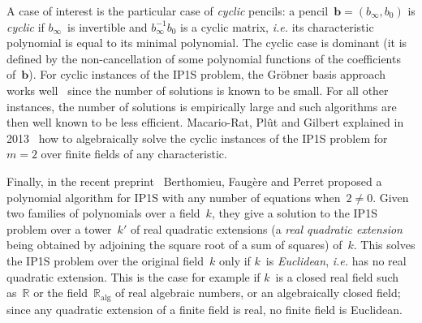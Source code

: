 \documentclass{article}%
\begin{document}
A case of interest is the particular case of \emph{cyclic} pencils: a
pencil~$\bm{b} = (b_{∞}, b_0)$ is \emph{cyclic} if $b_{∞}$~is invertible
and $b_{∞}^{-1} b_{0}$ is a cyclic matrix, \emph{i.e.} its characteristic
polynomial is equal to its minimal polynomial. The cyclic case is
dominant (it is defined by the non-cancellation of some polynomial
functions of the coefficients of~$\bm{b}$). For cyclic instances of the
IP1S problem, the Gröbner basis approach works
well~\cite{DBLP:conf/pkc/BouillaguetFFP11} since the number of solutions
is known to be small. For all other instances, the number of solutions is
empirically large and such algorithms are then well known to be less
efficient. Macario-Rat, Plût and Gilbert explained in 2013~\cite{MPG2013}
how to algebraically solve the cyclic instances of the IP1S problem for
$m=2$ over finite fields of any characteristic.

Finally, in the recent preprint~\cite{DBLP:journals/corr/BerthomieuFP13}
Berthomieu, Faugère and Perret proposed a polynomial
algorithm for IP1S with any number of equations when~$2 ≠ 0$. Given two
families of polynomials over a field~$k$, they give a solution to the
IP1S problem over a tower~$k'$ of real quadratic extensions (a \emph{real
quadratic extension} being obtained by adjoining the square root of a sum
of squares) of~$k$. This solves the IP1S problem over the original
field~$k$ only if $k$~is \emph{Euclidean}, \emph{i.e.} has no real
quadratic extension. This is the case for example if $k$~is a closed real
field such as~$ℝ$ or the field~$ℝ_{\mathrm{alg}}$ of real algebraic
numbers, or an algebraically closed field; since any quadratic extension
of a finite field is real, no finite field is Euclidean.
\end{document}
